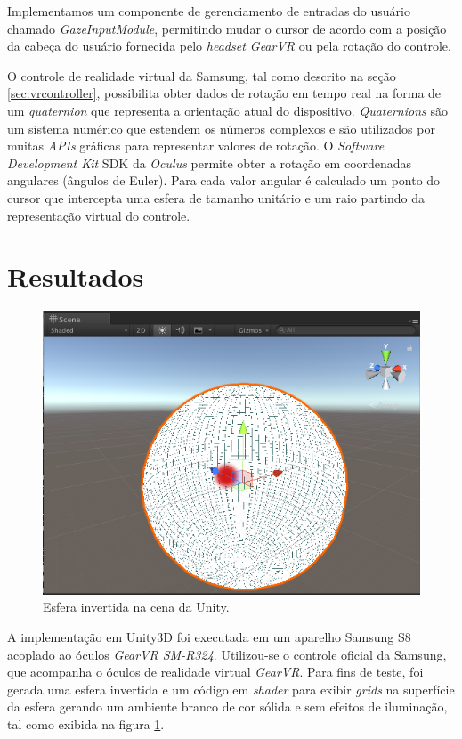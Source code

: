 \documentclass[conference]{IEEEtran}
\begin{document}
Implementamos um componente de gerenciamento de entradas do usuário chamado \textit{GazeInputModule}, permitindo mudar o cursor de acordo com a posição da cabeça do usuário fornecida pelo \textit{headset GearVR} ou pela rotação do controle.


O controle de realidade virtual da Samsung, tal como descrito na seção \ref{sec:vrcontroller}, possibilita obter dados de rotação em tempo real \cite{gearvrinputdocs} na forma de um \textit{quaternion} \cite{quaternionhamilton1844ii} que representa a orientação atual do dispositivo. \textit{Quaternions} são um sistema numérico que estendem os números complexos e são utilizados por muitas \textit{APIs} gráficas para representar valores de rotação. O \textit{Software Development Kit} SDK da \textit{Oculus} permite obter a rotação em coordenadas angulares (ângulos de Euler). Para cada valor angular é calculado um ponto do cursor que intercepta uma esfera de tamanho unitário e um raio partindo da representação virtual do controle.


\section{Resultados} \label{sec:results}

\begin{figure}[ht]
\centering
\includegraphics[width=.5\textwidth]{images/sphere.png}
\caption{Esfera invertida na cena da Unity.}
\label{fig:invertsphere}
\end{figure}

A implementação em Unity3D foi executada em um aparelho Samsung S8 acoplado ao óculos \textit{GearVR SM-R324}. Utilizou-se o controle oficial da Samsung, que acompanha o óculos de realidade virtual \textit{GearVR}. Para fins de teste, foi gerada uma esfera invertida e um código em \textit{shader} para exibir \textit{grids} na superfície da esfera gerando um ambiente branco de cor sólida e sem efeitos de iluminação, tal como exibida na figura \ref{fig:invertsphere}.
\end{document}

